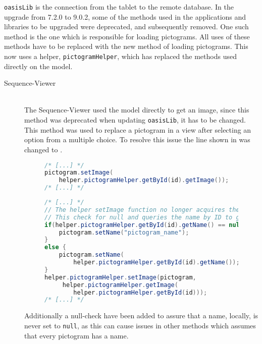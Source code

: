 \texttt{oasisLib} is the connection from the tablet to the remote database. 
In the upgrade from 7.2.0 to 9.0.2, some of the methods used in the applications and libraries to be upgraded were deprecated, and subsequently removed. 
One such method is the one which is responsible for loading pictograms. 
All uses of these methods have to be replaced with the new method of loading pictograms. 
This now uses a helper, \texttt{pictogramHelper}, which has replaced the methods used directly on the model. 
  
\begin{description} 
    \item[Sequence-Viewer] \hfill \\ 
    The Sequence-Viewer used the model directly to get an image, since this method was deprecated when updating \texttt{oasisLib}, it has to be changed. 
    This method was used to replace a pictogram in a view after selecting an option from a multiple choice. 
     To resolve this issue the line shown in  was changed to . 
     \begin{figure} 
        \begin{lstlisting}[language=java, caption={Sequence-Viewer with deprecated method call. }, label=lst:dep-sv-prev] 
/* [...] */ 
pictogram.setImage( 
    helper.pictogramHelper.getById(id).getImage()); 
/* [...] */ 
        \end{lstlisting} 
    \end{figure} 
    \begin{figure} 
        \begin{lstlisting}[language=java, caption={Sequence-Viewer replacement code. }, label=lst:dep-sv-upd] 
/* [...] */ 
// The helper setImage function no longer acquires the pictogram name and causes null exception error 
// This check for null and queries the name by ID to get name 
if(helper.pictogramHelper.getById(id).getName() == null) { 
    pictogram.setName("pictogram_name"); 
} 
else { 
    pictogram.setName( 
        helper.pictogramHelper.getById(id).getName()); 
} 
helper.pictogramHelper.setImage(pictogram, 
     helper.pictogramHelper.getImage( 
        helper.pictogramHelper.getById(id))); 
/* [...] */ 
        \end{lstlisting} 
    \end{figure} 
    Additionally a null-check have been added to assure that a name, locally, is never set to \texttt{null}, as this can cause issues in other methods which assumes that every pictogram has a name. 

\end{description}
